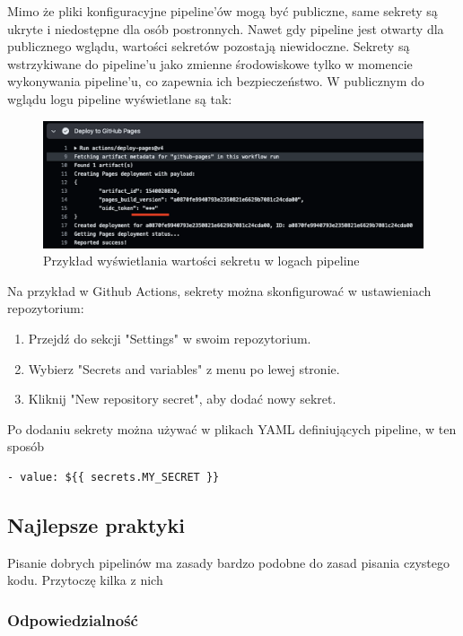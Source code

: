 \documentclass{article}
\begin{document}
Mimo że pliki konfiguracyjne pipeline'ów mogą być publiczne, same sekrety są ukryte i niedostępne dla osób postronnych. Nawet gdy pipeline jest otwarty dla publicznego wglądu, wartości sekretów pozostają niewidoczne. Sekrety są wstrzykiwane do pipeline'u jako zmienne środowiskowe tylko w momencie wykonywania pipeline'u, co zapewnia ich bezpieczeństwo. W publicznym do wglądu logu pipeline wyświetlane są tak:

\begin{figure}[H]
    \centering
    \includegraphics[width=1\linewidth]{actionsLogSecrets.png}
    \caption{Przykład wyświetlania wartości sekretu w logach pipeline}
    \label{fig:enter-label}
\end{figure}

Na przykład w Github Actions, sekrety można skonfigurować w ustawieniach repozytorium:

\begin{enumerate}
\item Przejdź do sekcji "Settings" w swoim repozytorium.
\item Wybierz "Secrets and variables" z menu po lewej stronie.
\item Kliknij "New repository secret", aby dodać nowy sekret.
\end{enumerate}

Po dodaniu sekrety można używać w plikach YAML definiujących pipeline, w ten sposób

\begin{lstlisting}[caption=Przykładowa konfiguracja pipeline'u w Github Actions]
- value: ${{ secrets.MY_SECRET }}
\end{lstlisting}

\subsection{Najlepsze praktyki}
Pisanie dobrych pipelinów ma zasady bardzo podobne do zasad pisania czystego kodu. Przytoczę kilka z nich

\subsubsection{Odpowiedzialność}
\end{document}
